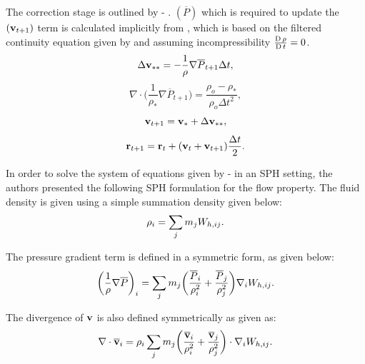 The correction stage is outlined by  - . $(\overline{P})$ which is required to update the $(\mathbf{v}_{t+1})$ term is calculated implicitly from , which is based on the filtered continuity equation given by  and assuming incompressibility $\frac{\operatorname{D} \rho}{\operatorname{D} t}=0$.
\begin{equation}
    \Delta \mathbf{v}_{**} = -\frac{1}{\rho} \nabla \overline{P}_{t+1} \Delta t,
    \label{eq:Gotoh2004-correct-start}
\end{equation}
\begin{equation}
    \nabla \cdot \bigg( \frac{1}{\rho_*} \nabla \overline{P}_{t+1} \bigg) = \frac{\rho_o - \rho_*}{\rho_o \Delta t^2},
    \label{eq:Gotoh2004-correct-pressure-implicit}
\end{equation}
\begin{equation}
    \mathbf{v}_{t+1} = \mathbf{v}_* + \Delta \mathbf{v}_{**},
\end{equation}
\begin{equation}
    \mathbf{r}_{t+1} = \mathbf{r}_t + (\mathbf{v}_t + \mathbf{v}_{t+1})\frac{\Delta t}{2}.
    \label{eq:Gotoh2004-correct-end}
\end{equation}

In order to solve the system of equations given by  -  in an SPH setting, the authors presented the following SPH formulation for the flow property. The fluid density is given using a simple summation density given below:
\begin{equation}
    \rho_i = \sum_j m_jW_{h, ij}.
    \label{eq:Gotoh2004-summation-density}
\end{equation}

The pressure gradient term is defined in a symmetric form, as given below:
\begin{equation}
    \bigg( \frac{1}{\rho} \nabla \overline{P} \bigg)_i = \sum_j m_j \bigg( \frac{\overline{P}_i}{\rho_i^2} + \frac{\overline{P}_j}{\rho_j^2} \bigg) \nabla_{i} W_{h, ij}.
    \label{eq:Gotoh2004-grad-p-sph}
\end{equation}

The divergence of $\mathbf{v}$ is also defined symmetrically as given as:
\begin{equation}
    \nabla \cdot \mathbf{\overline{v}}_i = \rho_i \sum_j m_j \bigg(\frac{\mathbf{\overline{v}}_i}{\rho^2_i} + \frac{\mathbf{\overline{v}}_j}{\rho^2_j} \bigg) \cdot \nabla_{i} W_{h, ij}.
    \label{eq:Gotoh2004-div-u-sph}
\end{equation}

